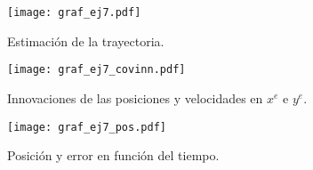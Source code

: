 
\begin{figure}[H]
\centering
\texttt{[image: graf\_ej7.pdf]}
\caption{Estimación de la trayectoria.}
\label{fig:ej7} 
\end{figure}


\begin{figure}[H]
\centering
\texttt{[image: graf\_ej7\_covinn.pdf]}
\caption{Innovaciones de las posiciones y velocidades en $x^e$ e $y^e$.}
\label{fig:7covinn} 
\end{figure}


\pagebreak



\vspace*{\fill}
\begin{figure}[H]
\centering
\texttt{[image: graf\_ej7\_pos.pdf]}
\caption{Posición y error en función del tiempo.}
\label{fig:7pos} 
\end{figure}
\vspace*{\fill}

\pagebreak





